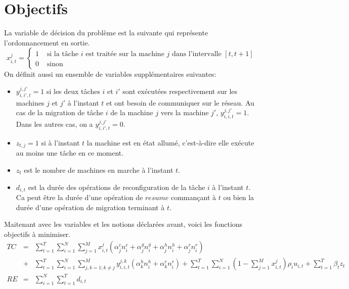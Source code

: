 \section{Objectifs}
La variable de décision du problème est la suivante qui représente l'ordonnancement en sortie.
$$x_{i,t}^{j}=
\left\{ \begin{array}{rl}
			 1 &\mbox{ si la tâche $i$ est traitée sur la machine $j$ dans l'intervalle $[t, t+1]$} \\
			 0 &\mbox{ sinon}
       \end{array} \right.$$
On définit aussi un ensemble de variables supplémentaires suivantes:
\begin{itemize}
	\item $y_{i,i\prime,t}^{j, j\prime} = 1$ si les deux tâches $i$ et $i\prime$ sont exécutées respectivement sur les machines $j$ et $j\prime$ à l'instant $t$ et ont besoin de communiquer sur le réseau. Au cas de la migration de tâche $i$ de la machine $j$ vers la machine $j\prime$, $y_{i,i,t}^{j, j\prime} = 1$. Dans les autres cas, on a $y_{i,i\prime,t}^{j, j\prime} = 0$.
	\item $z_{t,j} = 1$ si à l'instant $t$ la machine est en état allumé, c'est-à-dire elle exécute au moins une tâche en ce moment.
	\item $z_t$ est le nombre de machines en marche à l'instant $t$.
	\item $d_{i,t}$ est la durée des opérations de reconfiguration de la tâche $i$ à l'instant $t$. Ca peut être la durée d'une opération de $resume$ commançant à $t$ ou bien la durée d'une opération de migration terminant à $t$.
\end{itemize}	
Maitenant avec les variables et les notions déclarées avant, voici les fonctions objectifs à minimiser.
\begin{eqnarray*}
TC &=& \sum_{t=1}^{T}\sum_{i=1}^{N}\sum_{j=1}^{M}{x_{i,t}^{j}(\alpha_j^cn_i^c + \alpha_j^gn_i^g + \alpha_j^hn_i^h + \alpha_j^rn_i^r)} \\
&+&  \sum_{t=1}^{T}\sum_{i=1}^{N}\sum_{j,k=1; k\neq j}^{M}{y_{i,i,t}^{j,k}(\alpha_k^hn_i^h + \alpha_k^rn_i^r)} + \sum_{t=1}^{T}\sum_{i=1}^{N}(1 - \sum_{j=1}^{M}x_{i,t}^{j})\rho_iu_{i,t} +  \sum_{t=1}^{T}{\beta_tz_t}\\
RE &=& \sum_{i=1}^{N}\sum_{t=1}^{T}d_{i,t}
\end{eqnarray*}
